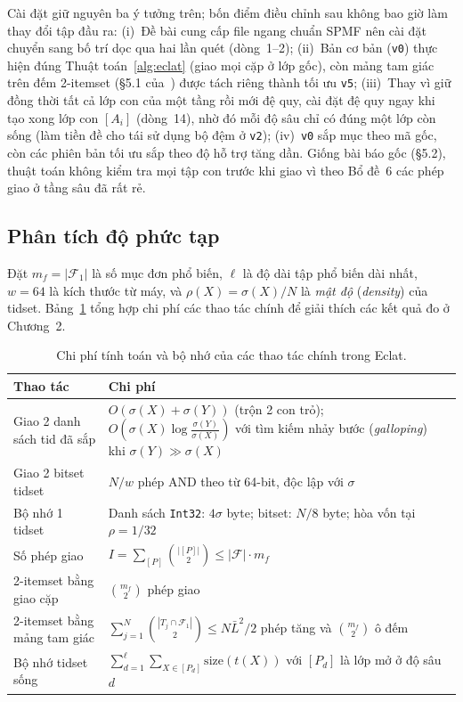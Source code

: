 Cài đặt giữ nguyên ba ý tưởng trên; bốn điểm điều chỉnh sau không bao giờ làm thay đổi tập đầu ra:
(i)~Đề bài cung cấp file ngang chuẩn SPMF nên cài đặt chuyển sang bố trí dọc qua hai lần quét (dòng~1--2);
(ii)~Bản cơ bản (\texttt{v0}) thực hiện đúng Thuật toán~\ref{alg:eclat} (giao mọi cặp ở lớp gốc), còn mảng tam giác trên đếm 2-itemset (§5.1 của~\cite{zaki2000scalable}) được tách riêng thành tối ưu \texttt{v5};
(iii)~Thay vì giữ đồng thời tất cả lớp con của một tầng rồi mới đệ quy, cài đặt đệ quy ngay khi tạo xong lớp con $[A_i]$ (dòng~14), nhờ đó mỗi độ sâu chỉ có đúng một lớp còn sống (làm tiền đề cho tái sử dụng bộ đệm ở \texttt{v2});
(iv)~\texttt{v0} sắp mục theo mã gốc, còn các phiên bản tối ưu sắp theo độ hỗ trợ tăng dần. Giống bài báo gốc (§5.2), thuật toán không kiểm tra mọi tập con trước khi giao vì theo Bổ đề~6 các phép giao ở tầng sâu đã rất rẻ.

\subsection{Phân tích độ phức tạp}
\label{subsec:complexity}

Đặt $m_f = |\mathcal{F}_1|$ là số mục đơn phổ biến, $\ell$ là độ dài tập phổ biến dài nhất, $w = 64$ là kích thước từ máy, và $\rho(X) = \sigma(X)/N$ là \emph{mật độ} (\emph{density}) của tidset. Bảng~\ref{tab:complexity} tổng hợp chi phí các thao tác chính để giải thích các kết quả đo ở Chương~2.

\begin{table}[!t]
\centering
\caption{Chi phí tính toán và bộ nhớ của các thao tác chính trong Eclat.}
\label{tab:complexity}
\scriptsize
\begin{tabular}{@{}p{2.7cm}p{5.5cm}@{}}
\toprule
Thao tác & Chi phí \\
\midrule
Giao 2 danh sách tid đã sắp & $O(\sigma(X) + \sigma(Y))$ (trộn 2 con trỏ); $O\!\left(\sigma(X)\log\frac{\sigma(Y)}{\sigma(X)}\right)$ với tìm kiếm nhảy bước (\emph{galloping})~\cite{bentley1976almost} khi $\sigma(Y) \gg \sigma(X)$ \\
Giao 2 bitset tidset & $N/w$ phép AND theo từ 64-bit, độc lập với $\sigma$ \\
Bộ nhớ 1 tidset & Danh sách \texttt{Int32}: $4\sigma$ byte; bitset: $N/8$ byte; hòa vốn tại $\rho = 1/32$ \\
Số phép giao & $I = \sum_{[P]} \binom{|[P]|}{2} \le |\mathcal{F}| \cdot m_f$ \\
2-itemset bằng giao cặp & $\binom{m_f}{2}$ phép giao \\
2-itemset bằng mảng tam giác & $\sum_{j=1}^{N} \binom{|T_j \cap \mathcal{F}_1|}{2} \le N\bar{L}^2/2$ phép tăng và $\binom{m_f}{2}$ ô đếm \\
Bộ nhớ tidset sống & $\sum_{d=1}^{\ell} \sum_{X \in [P_d]} \mathrm{size}(t(X))$ với $[P_d]$ là lớp mở ở độ sâu $d$ \\
\bottomrule
\end{tabular}
\end{table}

